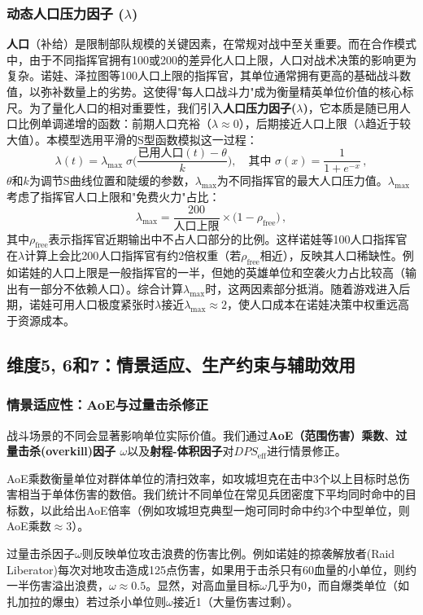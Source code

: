 \documentclass[a4paper,12pt]{article}
\begin{document}
\begin{CJK}{UTF8}{gbsn}
\subsubsection{动态人口压力因子 ($\lambda$)}
\textbf{人口}（补给）是限制部队规模的关键因素，在常规对战中至关重要。而在合作模式中，由于不同指挥官拥有100或200的差异化人口上限，人口对战术决策的影响更为复杂。诺娃、泽拉图等100人口上限的指挥官，其单位通常拥有更高的基础战斗数值，以弥补数量上的劣势。这使得"每人口战斗力"成为衡量精英单位价值的核心标尺。为了量化人口的相对重要性，我们引入\textbf{人口压力因子($\lambda$)}，它本质是随已用人口比例单调递增的函数：前期人口充裕（$\lambda\approx0$），后期接近人口上限（$\lambda$趋近于较大值）。本模型选用平滑的S型函数模拟这一过程：
\[
\lambda(t) = \lambda_{\max}\;\sigma\!\Big(\frac{\text{已用人口}(t) - \theta}{k}\Big), \quad \text{其中 }\sigma(x)=\frac{1}{1+e^{-x}}\,,
\]
$\theta$和$k$为调节S曲线位置和陡缓的参数，$\lambda_{\max}$为不同指挥官的最大人口压力值。$\lambda_{\max}$考虑了指挥官人口上限和"免费火力"占比：
\[
\lambda_{\max} = \frac{200}{\text{人口上限}} \times \big(1 - \rho_{\text{free}}\big)\,,
\]
其中$\rho_{\text{free}}$表示指挥官近期输出中不占人口部分的比例。这样诺娃等100人口指挥官在$\lambda$计算上会比200人口指挥官有约2倍权重（若$\rho_{\text{free}}$相近），反映其人口稀缺性。例如诺娃的人口上限是一般指挥官的一半，但她的英雄单位和空袭火力占比较高（输出有一部分不依赖人口）。综合计算$\lambda_{\max}$时，这两因素部分抵消。随着游戏进入后期，诺娃可用人口极度紧张时$\lambda$接近$\lambda_{\max}\approx2$，使人口成本在诺娃决策中权重远高于资源成本。

\subsection{维度5, 6和7：情景适应、生产约束与辅助效用}
\subsubsection{情景适应性：AoE与过量击杀修正}
战斗场景的不同会显著影响单位实际价值。我们通过\textbf{AoE（范围伤害）乘数}、\textbf{过量击杀(overkill)因子 $\omega$}以及\textbf{射程-体积因子}对$DPS_{\text{eff}}$进行情景修正。

AoE乘数衡量单位对群体单位的清扫效率，如攻城坦克在击中3个以上目标时总伤害相当于单体伤害的数倍。我们统计不同单位在常见兵团密度下平均同时命中的目标数，以此给出AoE倍率（例如攻城坦克典型一炮可同时命中约3个中型单位，则AoE乘数$\approx3$）。

过量击杀因子$\omega$则反映单位攻击浪费的伤害比例。例如诺娃的掠袭解放者(Raid Liberator)每次对地攻击造成125点伤害，如果用于击杀只有60血量的小单位，则约一半伤害溢出浪费，$\omega\approx0.5$。显然，对高血量目标$\omega$几乎为0，而自爆类单位（如扎加拉的爆虫）若过杀小单位则$\omega$接近1（大量伤害过剩）。


\end{CJK}
\end{document}
